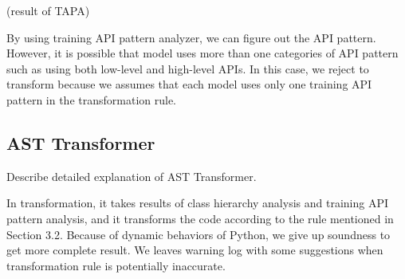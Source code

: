 (result of TAPA)

By using training API pattern analyzer, we can figure out the API pattern.
However, it is possible that model uses more than one categories of API pattern
such as using both low-level and high-level APIs.
In this case, we reject to transform because we assumes
that each model uses only one training API pattern in the transformation rule.

\subsection{AST Transformer}
Describe detailed explanation of AST Transformer.

In transformation, it takes results of class hierarchy analysis
and training API pattern analysis, and it transforms the code
according to the rule mentioned in Section 3.2.
Because of dynamic behaviors of Python, we give up soundness
to get more complete result.
We leaves warning log with some suggestions
when transformation rule is potentially inaccurate.

